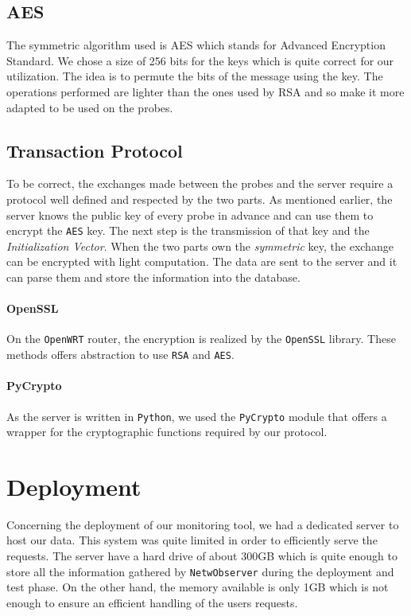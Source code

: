 \subsection{AES}
The symmetric algorithm used is AES which stands for Advanced Encryption Standard. We chose a size of 256 bits for the keys which is quite correct for our utilization. The idea is to permute the bits of the message using the key. The operations performed are lighter than the ones used by RSA and so make it more adapted to be used on the probes.


\subsection{Transaction Protocol}
To be correct, the exchanges made between the probes and the server require a protocol well defined and respected by the two parts. As mentioned earlier, the server knows the public key of every probe in advance and can use them to encrypt the \texttt{AES} key. The next step is the transmission of that key and the \emph{Initialization Vector}. When the two parts own the \emph{symmetric} key, the exchange can be encrypted with light computation. The data are sent to the server and it can parse them and store the information into the database.
\paragraph*{OpenSSL}
On the \texttt{OpenWRT} router, the encryption is realized by the \texttt{OpenSSL} library. These methods offers abstraction to use \texttt{RSA} and \texttt{AES}.

\paragraph*{PyCrypto} As the server is written in \texttt{Python}, we used the \texttt{PyCrypto} module that offers a wrapper for the cryptographic functions required by our protocol.

\section{Deployment}
Concerning the deployment of our monitoring tool, we had a dedicated server to host our data. This system was quite limited in order to efficiently serve the requests. The server have a hard drive of about 300GB which is quite enough to store all the information gathered by \texttt{NetwObserver} during the deployment and test phase. On the other hand, the memory available is only 1GB which is not enough to ensure an efficient handling of the users requests.

